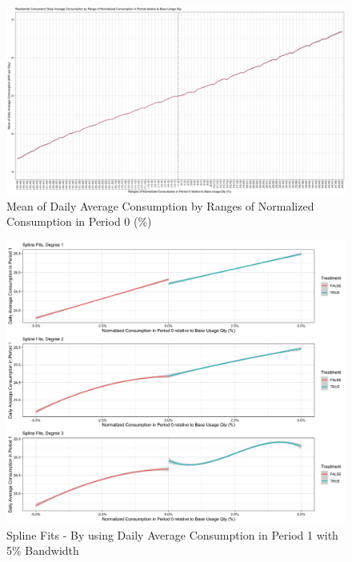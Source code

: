 \clearpage


\clearpage


\clearpage
\begin{landscape}

\end{landscape}


\clearpage
\setcounter{figure}{1}
\begin{figure}
    \centering
    \includegraphics[scale = 0.085]{02_Plots/SMUD-Billing-Data_RD-Approach_Mean-by-Range}
    \caption{Mean of Daily Average Consumption by Ranges of Normalized Consumption in Period 0 (\%)}
    \label{Figure:Mean-by-Ranges}
\end{figure}


\clearpage
\begin{figure}
    \centering
    \includegraphics[scale = 0.13]{02_Plots/SMUD-Billing-Data_RD-Approach_Spline_BW-5}
    \caption{Spline Fits - By using Daily Average Consumption in Period 1 with 5\% Bandwidth}
    \label{Figure:Spline_5P}
\end{figure}

